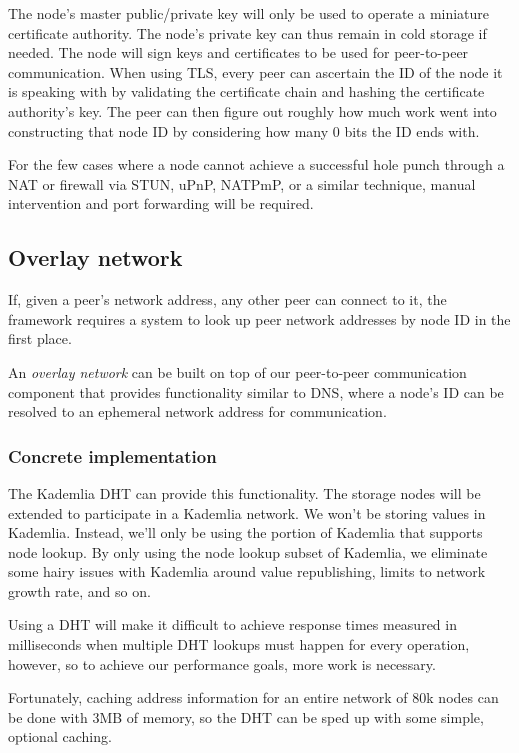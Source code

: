 \documentclass[a4paper,10pt]{article}
\begin{document}
The node's master public/private key will only be used to operate a miniature
certificate authority. The node's private key can thus remain in cold storage
if needed. The node will sign keys and certificates to be used for peer-to-peer
communication. When using TLS, every peer can ascertain the ID of the node it
is speaking with by validating the certificate chain and hashing the certificate
authority's key. The peer can then figure out roughly how much work went into
constructing that node ID by considering how many 0 bits the ID ends with.

For the few cases where a node cannot achieve a successful hole punch through a
NAT or firewall via STUN, uPnP, NATPmP, or a similar technique, manual
intervention and port forwarding will be required.

\subsection{Overlay network}

If, given a peer's network address, any other peer can connect to it, the
framework requires a system to look up peer network addresses by node ID in
the first place.

An {\em overlay network} can be built on top of our peer-to-peer communication
component that provides functionality similar to DNS, where a node's ID can be
resolved to an ephemeral network address for communication.

\subsubsection{Concrete implementation}

The Kademlia\cite{kad} DHT can provide this functionality. The storage
nodes will be extended to participate in a Kademlia network.
We won't be storing values in Kademlia.
Instead, we'll only be using the portion of Kademlia that supports node lookup.
By only using the node lookup subset of Kademlia, we eliminate some hairy
issues with Kademlia around value republishing, limits to network growth rate,
and so on.

Using a DHT will make it difficult to achieve response times measured in
milliseconds when multiple DHT lookups must happen for every operation, however,
so to achieve our performance goals, more work is necessary.

Fortunately, caching address information for an entire network of 80k nodes can
be done with 3MB of memory, so the DHT can be sped up with some simple, optional
caching.
\end{document}
